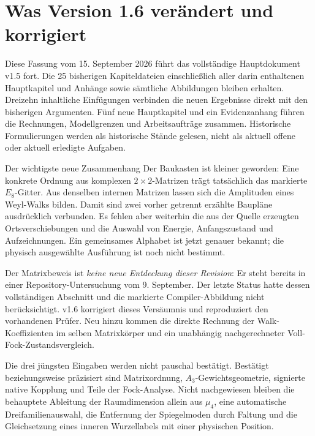 \section*{Was Version 1.6 verändert und korrigiert}
Diese Fassung vom 15. September 2026 führt das vollständige Hauptdokument v1.5 fort. Die 25 bisherigen Kapiteldateien einschließlich aller darin enthaltenen Hauptkapitel und Anhänge sowie sämtliche Abbildungen bleiben erhalten. Dreizehn inhaltliche Einfügungen verbinden die neuen Ergebnisse direkt mit den bisherigen Argumenten. Fünf neue Hauptkapitel und ein Evidenzanhang führen die Rechnungen, Modellgrenzen und Arbeitsaufträge zusammen. Historische Formulierungen werden als historische Stände gelesen, nicht als aktuell offene oder aktuell erledigte Aufgaben.

\begin{bild}{Der wichtigste neue Zusammenhang}
Der Baukasten ist kleiner geworden: Eine konkrete Ordnung aus komplexen $2\times2$-Matrizen trägt tatsächlich das markierte $E_8$-Gitter. Aus denselben internen Matrizen lassen sich die Amplituden eines Weyl-Walks bilden. Damit sind zwei vorher getrennt erzählte Baupläne ausdrücklich verbunden. Es fehlen aber weiterhin die aus der Quelle erzeugten Ortsverschiebungen und die Auswahl von Energie, Anfangszustand und Aufzeichnungen. Ein gemeinsames Alphabet ist jetzt genauer bekannt; die physisch ausgewählte Ausführung ist noch nicht bestimmt.
\end{bild}

Der Matrixbeweis ist \emph{keine neue Entdeckung dieser Revision}: Er steht bereits in einer Repository-Untersuchung vom 9. September. Der letzte Status hatte dessen vollständigen Abschnitt und die markierte Compiler-Abbildung nicht berücksichtigt. v1.6 korrigiert dieses Versäumnis und reproduziert den vorhandenen Prüfer. Neu hinzu kommen die direkte Rechnung der Walk-Koeffizienten im selben Matrixkörper und ein unabhängig nachgerechneter Voll-Fock-Zustandsvergleich.

Die drei jüngsten Eingaben werden nicht pauschal bestätigt. Bestätigt beziehungsweise präzisiert sind Matrixordnung, $A_3$-Gewichtsgeometrie, signierte native Kopplung und Teile der Fock-Analyse. Nicht nachgewiesen bleiben die behauptete Ableitung der Raumdimension allein aus $\mu_4$, eine automatische Dreifamilienauswahl, die Entfernung der Spiegelmoden durch Faltung und die Gleichsetzung eines inneren Wurzellabels mit einer physischen Position.

